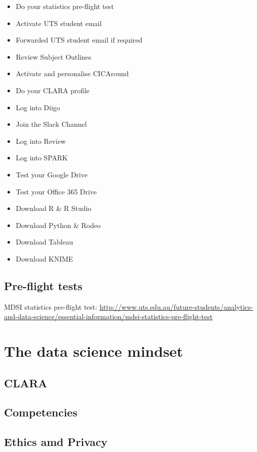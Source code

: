 \documentclass[]{book}
\providecommand{\tightlist}{%
  \setlength{\itemsep}{0pt}\setlength{\parskip}{0pt}}
\theoremstyle{definition}
\theoremstyle{definition}
\theoremstyle{remark}
\begin{document}
\begin{itemize}
\tightlist
\item
  Do your statistics pre-flight test
\item
  Activate UTS student email
\item
  Forwarded UTS student email if required
\item
  Review Subject Outlines
\item
  Activate and personalise CICAround
\item
  Do your CLARA profile
\item
  Log into Diigo
\item
  Join the Slack Channel
\item
  Log into Review
\item
  Log into SPARK
\item
  Test your Google Drive
\item
  Test your Office 365 Drive
\item
  Download R \& R Studio
\item
  Download Python \& Rodeo
\item
  Download Tableau
\item
  Download KNIME
\end{itemize}

\section{Pre-flight tests}\label{pre-flight-tests}

MDSI statistics pre-flight test:
\url{http://www.uts.edu.au/future-students/analytics-and-data-science/essential-information/mdsi-statistics-pre-flight-test}

\chapter{The data science mindset}\label{the-data-science-mindset}

\section{CLARA}\label{clara}

\section{Competencies}\label{competencies}

\section{Ethics amd Privacy}\label{ethics-amd-privacy}
\end{document}
